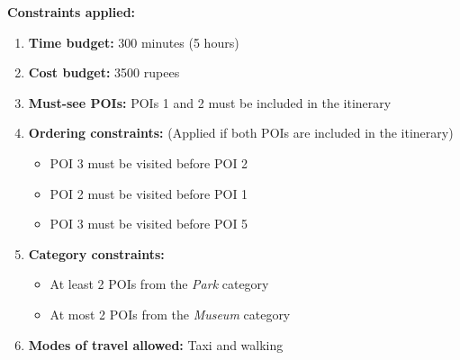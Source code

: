 \documentclass[sigconf,authordraft]{acmart}
\begin{document}
\begin{table}[H]
\centering
{}
\caption{Taxi Travel Time Matrix (in minutes)}
\label{tab:taxi_time_matrix}
\end{table}


\textbf{Constraints applied:}
\begin{enumerate}[label=\textbf{\arabic*.}]
    \item \textbf{Time budget:} 300 minutes (5 hours)
    \item \textbf{Cost budget:} 3500 rupees
    \item \textbf{Must-see POIs:} POIs 1 and 2 must be included in the itinerary
    \item \textbf{Ordering constraints:} (Applied if both POIs are included in the itinerary)
    \begin{itemize}
        \item POI 3 must be visited before POI 2
        \item POI 2 must be visited before POI 1
        \item POI 3 must be visited before POI 5
    \end{itemize}
    \item \textbf{Category constraints:}
    \begin{itemize}
        \item At least 2 POIs from the \textit{Park} category
        \item At most 2 POIs from the \textit{Museum} category
    \end{itemize}
    \item \textbf{Modes of travel allowed:} Taxi and walking
\end{enumerate}
\end{document}
